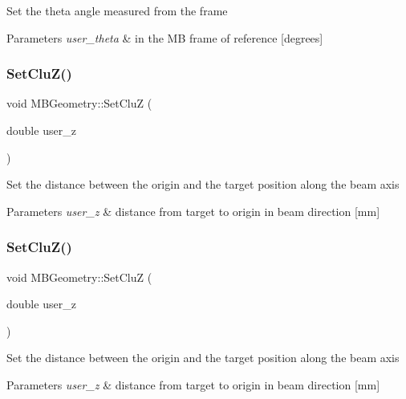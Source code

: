 Set the theta angle measured from the frame 
\begin{DoxyParams}{Parameters}
{\em user\+\_\+theta} & in the MB frame of reference \mbox{[}degrees\mbox{]} \\
\hline
\end{DoxyParams}
\mbox{\label{class_m_b_geometry_aa6b9d54c7157e8c65e2b208fcef8222c}} 
\subsubsection{\texorpdfstring{Set\+Clu\+Z()}{SetCluZ()}\hspace{0.1cm}{\footnotesize\ttfamily [1/2]}}
{\footnotesize\ttfamily void M\+B\+Geometry\+::\+Set\+CluZ (\begin{DoxyParamCaption}\item[{double}]{user\+\_\+z }\end{DoxyParamCaption})}

Set the distance between the origin and the target position along the beam axis 
\begin{DoxyParams}{Parameters}
{\em user\+\_\+z} & distance from target to origin in beam direction \mbox{[}mm\mbox{]} \\
\hline
\end{DoxyParams}
\mbox{\label{class_m_b_geometry_aa6b9d54c7157e8c65e2b208fcef8222c}} 
\subsubsection{\texorpdfstring{Set\+Clu\+Z()}{SetCluZ()}\hspace{0.1cm}{\footnotesize\ttfamily [2/2]}}
{\footnotesize\ttfamily void M\+B\+Geometry\+::\+Set\+CluZ (\begin{DoxyParamCaption}\item[{double}]{user\+\_\+z }\end{DoxyParamCaption})}

Set the distance between the origin and the target position along the beam axis 
\begin{DoxyParams}{Parameters}
{\em user\+\_\+z} & distance from target to origin in beam direction \mbox{[}mm\mbox{]} \\
\hline
\end{DoxyParams}
\mbox{\label{class_m_b_geometry_ac3751c8eb94c051b402c30cb14cba462}} 

